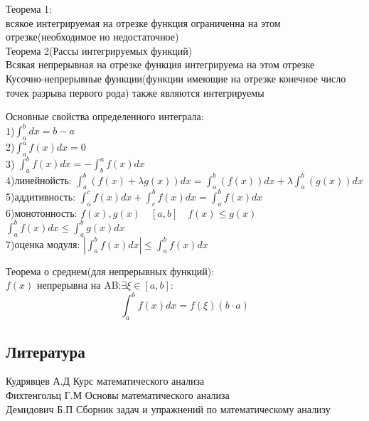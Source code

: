 \documentclass[a4paper, 12pt]{article}
\begin{document}
\begin{mdframed}[backgroundcolor=blue!20] 
        Теорема 1:\\
        всякое  интегрируемая на отрезке функция ограниченна на этом отрезке(необходимое но недостаточное)\\

        Теорема 2(Рассы интегрируемых функций)\\
        Всякая непрерывная на отрезке функция интегрируема на этом отрезке\\
        Кусочно-непрерывные функции(функции имеющие на отрезке конечное число точек разрыва первого рода) также являются интегрируемы\\

     \end{mdframed}

Основные свойства определенного интеграла:\\
1)$ \int_{a}^{b}dx = b - a  $ \\
2)$ \int_{a}^{a}f\left(x\right)dx = 0 $ \\
3) $ \int_{a}^{b}f\left(x\right)dx = - \int_{b}^{a}f\left(x\right)dx   $ \\
4)линейнойсть: $ \int_{a}^{b}\left(f(x) + \lambda g(x)\right)dx= \int_{a}^{b}\left(f(x)\right)dx + \lambda \int_{a}^{b}\left(g(x)\right)dx    $ \\
5)аддитивность: $ \int_{a}^{c}f\left(x\right)dx + \int_{c}^{b}f\left(x\right)dx = \int_{a}^{b}f\left(x\right)dx  $ \\ 
6)монотонность: $ f(x),g(x) \quad [a,b] \quad f(x) \leq g(x) $\\
$ \int_{a}^{b}f\left(x\right)dx \leq \int_{a}^{b}g\left(x\right)dx $  \\
7)оценка модуля: $ \left| \int_{a}^{b}f\left(x\right)dx\right| \leq \int_{a}^{b}f\left(x\right)dx   $\\
\begin{mdframed}[backgroundcolor=blue!20] 
        Теорема о среднем(для непрерывных функций):\\
        $ f(x) $ непрерывна на AB:$ \exists \xi \in [a,b] $:
        \[
            \int_{a}^{b}f\left(x\right)dx= f(\xi)(b\cdot a) 
          \]  
     \end{mdframed}























\newpage
\subsection*{Литература}
Кудрявцев А.Д Курс математического анализа\\
Фихтенгольц Г.М Основы математического анализа\\
Демидович Б.П Сборник задач и упражнений по математическому анализу\\
\end{document}
